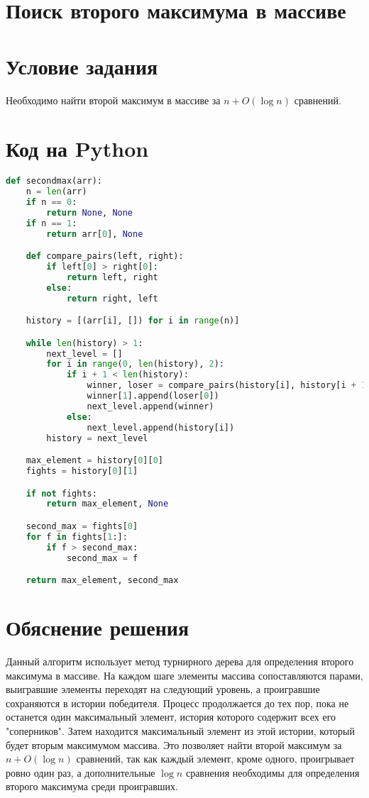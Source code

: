 \section*{Поиск второго максимума в массиве}


\section*{Условие задания}

Необходимо найти второй максимум в массиве за $n + O(\log n)$ сравнений.

\section*{Код на Python}

\begin{lstlisting}[language=Python]
def secondmax(arr):
    n = len(arr)
    if n == 0:
        return None, None
    if n == 1:
        return arr[0], None

    def compare_pairs(left, right):
        if left[0] > right[0]:
            return left, right
        else:
            return right, left

    history = [(arr[i], []) for i in range(n)]

    while len(history) > 1:
        next_level = []
        for i in range(0, len(history), 2):
            if i + 1 < len(history):
                winner, loser = compare_pairs(history[i], history[i + 1])
                winner[1].append(loser[0])
                next_level.append(winner)
            else:
                next_level.append(history[i])
        history = next_level

    max_element = history[0][0]
    fights = history[0][1]

    if not fights:
        return max_element, None

    second_max = fights[0]
    for f in fights[1:]:
        if f > second_max:
            second_max = f

    return max_element, second_max
\end{lstlisting}

\section*{Обяснение решения}

Данный алгоритм использует метод турнирного дерева для определения второго максимума в массиве. На каждом шаге элементы массива сопоставляются парами, выигравшие элементы переходят на следующий уровень, а проигравшие сохраняются в истории победителя. Процесс продолжается до тех пор, пока не останется один максимальный элемент, история которого содержит всех его "соперников". Затем находится максимальный элемент из этой истории, который будет вторым максимумом массива. Это позволяет найти второй максимум за $n + O(\log n)$ сравнений, так как каждый элемент, кроме одного, проигрывает ровно один раз, а дополнительные $\log n$ сравнения необходимы для определения второго максимума среди проигравших.


